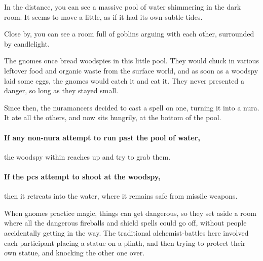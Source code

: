 \begin{multicols}{2}

\begin{boxtext}

  In the distance, you can see a massive pool of water shimmering in the dark room.
  It seems to move a little, as if it had its own subtle tides.

  Close by, you can see a room full of goblins arguing with each other, surrounded by candlelight.

\end{boxtext}

\begin{exampletext}

  The gnomes once bread woodspies in this little pool.
  They would chuck in various leftover food and organic waste from the surface world, and as soon as a woodspy laid some eggs, the gnomes would catch it and eat it.
  They never presented a danger, so long as they stayed small.

  Since then, the nuramancers decided to cast a spell on one, turning it into a nura.
  It ate all the others, and now sits hungrily, at the bottom of the pool.

\end{exampletext}


\paragraph{If any non-nura attempt to run past the pool of water,}
the woodspy within reaches up and try to grab them.

\paragraph{If the \glspl{pc} attempt to shoot at the woodspy,}
then it retreats into the water, where it remains safe from missile weapons.


\begin{exampletext}

  When gnomes practice magic, things can get dangerous, so they set aside a room where all the dangerous fireballs and shield spells could go off, without people accidentally getting in the way.
  The traditional alchemist-battles here involved each participant placing a statue on a plinth, and then trying to protect their own statue, and knocking the other one over.


\end{exampletext}
\end{multicols}
